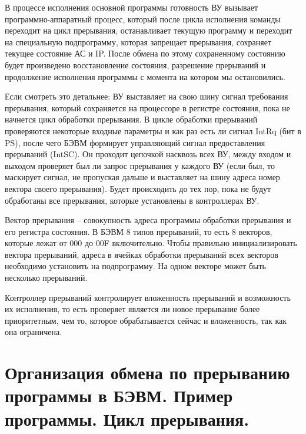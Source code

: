 \documentclass{article}
\begin{document}
В процессе исполнения основной программы готовность ВУ вызывает программно-аппаратный процесс, который после цикла исполнения команды переходит 
на цикл прерывания, останавливает текущую программу и переходит на специальную подпрограмму, которая запрещает прерывания, сохраняет текущее состояние АС и IP. 
После обмена по этому сохраненному состоянию будет произведено восстановление состояния, разрешение прерываний и продолжение исполнения программы 
с момента на котором мы остановились.


Если смотреть это детальнее: ВУ выставляет на свою шину сигнал требования прерывания, который сохраняется на процессоре в регистре состояния, пока не начнется цикл обработки прерывания. 
В цикле обработки прерываний проверяются некоторые входные параметры и как раз есть ли сигнал IntRq (бит в PS), после чего БЭВМ формирует управляющий сигнал предоставления прерываний (IntSC). 
Он проходит цепочкой насквозь всех ВУ, между входом и выходом проверяет был ли запрос прерывания у каждого ВУ (если был, то маскирует сигнал, не пропуская дальше и выставляет на шину адреса номер вектора своего прерывания). 
Будет происходить до тех пор, пока не будут обработаны все прерывания, которые установлены в контроллерах ВУ. 


Вектор прерывания – совокупность адреса программы обработки прерывания и его регистра состояния. 
В БЭВМ 8 типов прерываний, то есть 8 векторов, которые лежат от 000 до 00F включительно. Чтобы правильно инициализировать вектора прерываний, адреса в ячейках обработки прерываний всех векторов необходимо установить на подпрограмму. 
На одном векторе может быть несколько прерываний.


Контроллер прерываний контролирует вложенность прерываний и возможность их исполнения, то есть проверяет является ли новое прерывание более приоритетным, 
чем то, которое обрабатывается сейчас и вложенность, так как она ограничена. 


\section{Организация обмена по прерыванию программы в БЭВМ. Пример программы. Цикл прерывания.}
\end{document}
